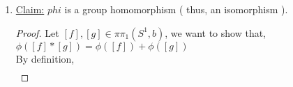 \begin{enumerate}
\begin{proof}
\begin{enumerate}
                        Then f is a loop in $S^1$ based at $b=(1,0)$ because
                        \begin{align*}
                            f(0)=p(\alpha(0))=p(0)=(1,0)\\
                            f(1)=p(\alpha(1))=p(c)=(1,0)\\
                        \end{align*}
                        And, $\tilde{f}=\alpha$ because $p\circ \tilde{f}=p\circ \alpha = f$. Thus,
                        \begin{align*}
                            \phi([f])=\tilde{f}(1)=\alpha(1)=c\\
                        \end{align*}
                    \item \underline{Injective:} Suppose,
                        \begin{align*}
                            \phi([f])=\phi([g])\\
                            \implies \tilde{f}(1)=\tilde{g}(1)\\
                        \end{align*}
                        Then, $\tilde{f}$ and $\tilde{g}$ are two paths in $\R$, that both start at 0
                        and both end at the same point.\\
                        $\Rightarrow$ (courtesy of homework 2) $\tilde{f}\cong_{p}\tilde{g}$ (because $\R$ is simply
                        connected)\\
                        $\Rightarrow$ $p\circ H$ is a path homotopy from $p\circ \tilde{f}$ to $p\circ \tilde{g}$.\\
                        $\Rightarrow f\cong_{p}g$\\
                        $\Rightarrow [f]=[g]\in \pi_1(S^1, b)$\\
                \end{enumerate}
            \end{proof}
        \item \underline{Claim:} $phi$ is a group homomorphism ( thus, an isomorphism ).\\
            \begin{proof}
                Let $[f], [g]\in \pi \pi_1(S^1,b)$, we want to show that,
                $\phi([f]*[g])=\phi([f])+\phi([g])$\\
                By definition,
                \begin{align*}

\end{align*}
\end{proof}
\end{enumerate}

